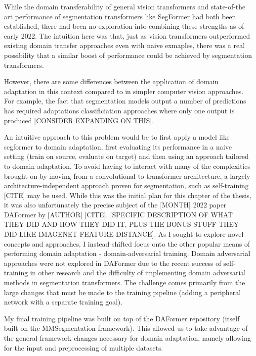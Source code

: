 \documentclass[a4paper,12pt]{report}
\begin{document}
While the domain transferability of general vision transformers and state-of-the art performance of segmentation transformers like SegFormer had both been established, there had been no exploration into combining these strengths as of early 2022.
The intuition here was that, just as vision transformers outperformed existing domain transfer approaches even with naive exmaples, there was a real possibility that a similar boost of performance could be achieved by segmentation transformers.

However, there are some differences between the application of domain adaptation in this context compared to in simpler computer vision approaches. For example, the fact that segmentation models output a number of predictions has required adaptations classificiation approaches where only one output is produced [CONSIDER EXPANDING ON THIS].

An intuitive approach to this problem would be to first apply a model like segformer to domain adaptation, first evaluating its performance in a naive setting (train on source, evaluate on target) and then using an approach tailored to domain adaptation. To avoid having to interact with many of the complexities brought on by moving from a convolutional to transformer architecture, a largely architecture-independent approach proven for segmentation, such as self-training [CITE] may be used. While this was the initial plan for this chapter of the thesis, it was also unfortunately the precise subject of the [MONTH] 2022 paper DAFormer by [AUTHOR] [CITE]. [SPECIFIC DESCRIPTION OF WHAT THEY DID AND HOW THEY DID IT, PLUS THE BONUS STUFF THEY DID LIKE IMAGENET FEATURE DISTANCE]. As I sought to explore novel concepts and approaches, I instead shifted focus onto the other popular means of performing domain adaptation - domain-adversarial training. Domain adversarial approaches were not explored in DAFormer due to the recent success of self-training in other research and the difficulty of implementing domain adversarial methods in segmentation transformers. The challenge comes primarily from the large changes that must be made to the training pipeline (adding a peripheral network with a separate training goal).

My final training pipeline was built on top of the DAFormer repository (itself built on the MMSegmentation framework). This allowed us to take advantage of the general framework changes necessary for domain adaptation, namely allowing for the input and preprocessing of multiple datasets.
\end{document}
